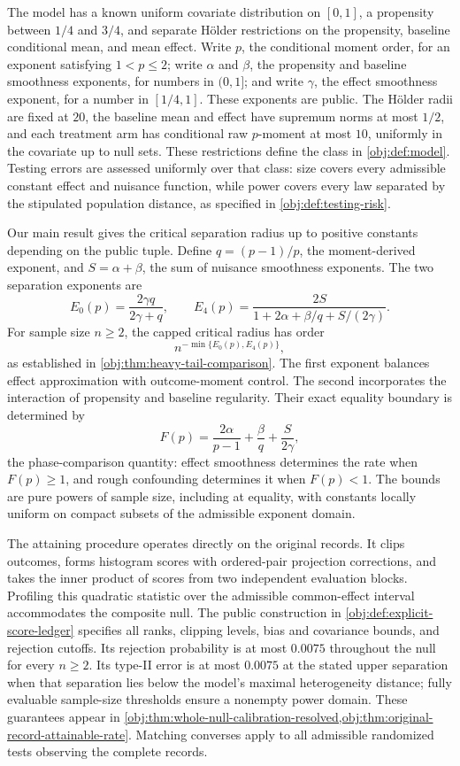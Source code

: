 The model has a known uniform covariate distribution on \([0,1]\), a propensity between \(1/4\) and \(3/4\), and separate Hölder restrictions on the propensity, baseline conditional mean, and mean effect. Write \(p\), the conditional moment order, for an exponent satisfying \(1<p\le2\); write \(\alpha\) and \(\beta\), the propensity and baseline smoothness exponents, for numbers in \((0,1]\); and write \(\gamma\), the effect smoothness exponent, for a number in \([1/4,1]\). These exponents are public. The Hölder radii are fixed at \(20\), the baseline mean and effect have supremum norms at most \(1/2\), and each treatment arm has conditional raw \(p\)-moment at most \(10\), uniformly in the covariate up to null sets. These restrictions define the class in \cref{obj:def:model}. Testing errors are assessed uniformly over that class: size covers every admissible constant effect and nuisance function, while power covers every law separated by the stipulated population distance, as specified in \cref{obj:def:testing-risk}.

Our main result gives the critical separation radius up to positive constants depending on the public tuple. Define \(q=(p-1)/p\), the moment-derived exponent, and \(S=\alpha+\beta\), the sum of nuisance smoothness exponents. The two separation exponents are
\[
E_0(p)=\frac{2\gamma q}{2\gamma+q},
\qquad
E_4(p)=
\frac{2S}{1+2\alpha+\beta/q+S/(2\gamma)}.
\]
For sample size \(n\ge2\), the capped critical radius has order
\[
n^{-\min\{E_0(p),E_4(p)\}},
\]
as established in \cref{obj:thm:heavy-tail-comparison}. The first exponent balances effect approximation with outcome-moment control. The second incorporates the interaction of propensity and baseline regularity. Their exact equality boundary is determined by
\[
F(p)=
\frac{2\alpha}{p-1}
+\frac{\beta}{q}
+\frac{S}{2\gamma},
\]
the phase-comparison quantity: effect smoothness determines the rate when \(F(p)\ge1\), and rough confounding determines it when \(F(p)<1\). The bounds are pure powers of sample size, including at equality, with constants locally uniform on compact subsets of the admissible exponent domain.

The attaining procedure operates directly on the original records. It clips outcomes, forms histogram scores with ordered-pair projection corrections, and takes the inner product of scores from two independent evaluation blocks. Profiling this quadratic statistic over the admissible common-effect interval accommodates the composite null. The public construction in \cref{obj:def:explicit-score-ledger} specifies all ranks, clipping levels, bias and covariance bounds, and rejection cutoffs. Its rejection probability is at most \(0.0075\) throughout the null for every \(n\ge2\). Its type-II error is at most \(0.0075\) at the stated upper separation when that separation lies below the model's maximal heterogeneity distance; fully evaluable sample-size thresholds ensure a nonempty power domain. These guarantees appear in \cref{obj:thm:whole-null-calibration-resolved,obj:thm:original-record-attainable-rate}. Matching converses apply to all admissible randomized tests observing the complete records.


